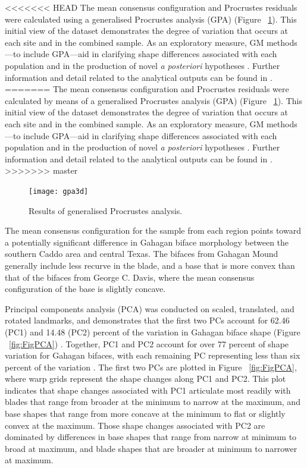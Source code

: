 \documentclass[review]{elsarticle}
\begin{document}
<<<<<<< HEAD
The mean consensus configuration and Procrustes residuals were calculated using a generalised Procrustes analysis (GPA) \citep[Figure 3]{RN1720} (Figure ~\ref{fig:FigGPA}). This initial view of the dataset demonstrates the degree of variation that occurs at each site and in the combined sample. As an exploratory measure, GM methods---to include GPA---aid in clarifying shape differences associated with each population and in the production of novel \textit{a posteriori} hypotheses \citep{RN1720}. Further information and detail related to the analytical outputs can be found in \citep{RN20850}.
=======
The mean consensus configuration and Procrustes residuals were calculated by means of a generalised Procrustes analysis (GPA) \citep[Figure 3]{RN1720} (Figure ~\ref{fig:FigGPA}). This initial view of the dataset demonstrates the degree of variation that occurs at each site and in the combined sample. As an exploratory measure, GM methods---to include GPA---aid in clarifying shape differences associated with each population and in the production of novel \textit{a posteriori} hypotheses \citep{RN1720}. Further information and detail related to the analytical outputs can be found in \citep{RN20850}.
>>>>>>> master

\begin{figure}[ht]\centering
\texttt{[image: gpa3d]}
\caption{Results of generalised Procrustes analysis.}
\label{fig:FigGPA}
\end{figure}

The mean consensus configuration for the sample from each region points toward a potentially significant difference in Gahagan biface morphology between the southern Caddo area and central Texas. The bifaces from Gahagan Mound generally include less recurve in the blade, and a base that is more convex than that of the bifaces from George C. Davis, where the mean consensus configuration of the base is slightly concave.

Principal components analysis (PCA) was conducted on scaled, translated, and rotated landmarks, and demonstrates that the first two PCs account for 62.46 (PC1) and 14.48 (PC2) percent of the variation in Gahagan biface shape (Figure ~\ref{fig:FigPCA}) \citep{RN20850}. Together, PC1 and PC2 account for over 77 percent of shape variation for Gahagan bifaces, with each remaining PC representing less than six percent of the variation \citep{RN20850}. The first two PCs are plotted in Figure ~\ref{fig:FigPCA}, where warp grids represent the shape changes along PC1 and PC2. This plot indicates that shape changes associated with PC1 articulate most readily with blades that range from broader at the minimum to narrow at the maximum, and base shapes that range from more concave at the minimum to flat or slightly convex at the maximum. Those shape changes associated with PC2 are dominated by differences in base shapes that range from narrow at minimum to broad at maximum, and blade shapes that are broader at minimum to narrower at maximum.
\end{document}
